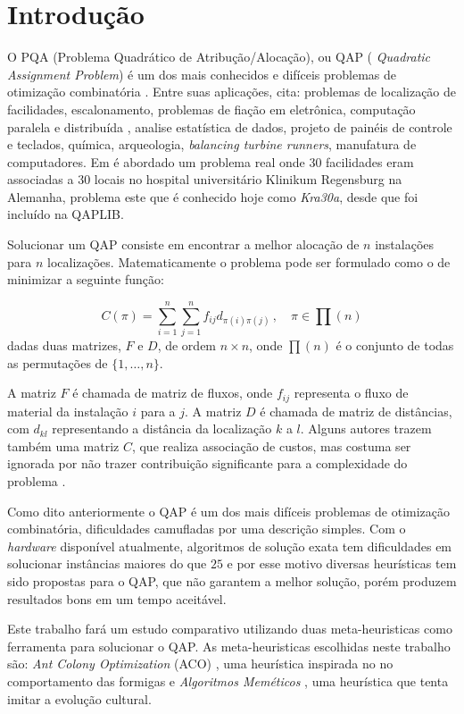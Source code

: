 \section{Introdução}

O PQA (Problema Quadrático de Atribução/Alocação), ou QAP (
\textit{Quadratic Assignment Problem})\cite{qap-origin} é um dos
mais conhecidos e difíceis problemas de otimização combinatória
\cite{Maniezzo98exactand}. Entre suas aplicações, \cite{QAPBOOK} cita:
problemas de localização de facilidades, escalonamento, problemas de
fiação em eletrônica, computação paralela e distribuída \cite{22},
analise estatística de dados, projeto de painéis de controle e teclados,
química, arqueologia, \textit{balancing turbine runners}, manufatura de
computadores. Em \cite{hospital} é abordado um problema real onde 30
facilidades eram associadas a 30 locais no hospital universitário Klinikum
Regensburg na Alemanha, problema este que é conhecido hoje como {\it
Kra30a}, desde que foi incluído na QAPLIB.

Solucionar um QAP consiste em encontrar a melhor alocação de $n$
instalações para $n$ localizações. Matematicamente o problema pode ser
formulado como o de minimizar a seguinte função:

 \[ C(\pi) = \sum_{i = 1}^{n} \sum_{j = 1}^{n} f_{ij} d_{\pi(i)
   \pi(j)} \, , \quad \pi \in \prod(n)  \]
dadas duas matrizes, $F$ e $D$, de ordem $n \times n$, onde $\prod(n)$ é o
conjunto de todas as permutações de $\{1, \ldots , n\}$.

A matriz $F$ é chamada de matriz de fluxos, onde $f_{ij}$ representa o fluxo de
material da instalação $i$ para a $j$. A matriz $D$ é chamada de
matriz de distâncias, com $d_{kl}$ representando a distância da
localização $k$ a $l$. Alguns autores trazem também uma matriz $C$,
que realiza associação de custos, mas costuma ser ignorada por não
trazer contribuição significante para a complexidade do  problema
\cite{QACO}.

Como dito anteriormente o QAP é um dos mais difíceis problemas de
otimização combinatória, dificuldades camufladas por uma descrição
simples. Com o {\it hardware} disponível atualmente, algoritmos de solução
exata tem dificuldades em solucionar instâncias maiores do que $25$ \cite{QACO} e por
esse motivo diversas heurísticas tem sido propostas para o QAP, que não
garantem a melhor solução, porém produzem resultados bons em um tempo
aceitável.

Este trabalho fará um estudo comparativo utilizando duas meta-heuristicas
como ferramenta para solucionar o QAP. As meta-heuristicas escolhidas
neste trabalho são: {\it Ant Colony Optimization} (ACO) \cite{ACO}, uma heurística
inspirada no no comportamento das formigas e {\it Algoritmos Meméticos}
\cite{moscato1}, uma heurística que tenta imitar a evolução cultural.


